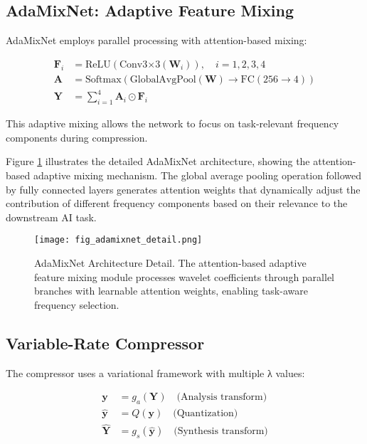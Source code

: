 \documentclass[conference]{IEEEtran}
\begin{document}
\subsection{AdaMixNet: Adaptive Feature Mixing}

AdaMixNet employs parallel processing with attention-based mixing:

\begin{align}
\mathbf{F}_i &= \text{ReLU}(\text{Conv3×3}(\mathbf{W}_i)), \quad i = 1, 2, 3, 4 \\
\mathbf{A} &= \text{Softmax}(\text{GlobalAvgPool}(\mathbf{W}) \to \text{FC}(256 \to 4)) \\
\mathbf{Y} &= \sum_{i=1}^{4} \mathbf{A}_i \odot \mathbf{F}_i
\end{align}

This adaptive mixing allows the network to focus on task-relevant frequency components during compression.

Figure \ref{fig:adamixnet_detail} illustrates the detailed AdaMixNet architecture, showing the attention-based adaptive mixing mechanism. The global average pooling operation followed by fully connected layers generates attention weights that dynamically adjust the contribution of different frequency components based on their relevance to the downstream AI task.

\begin{figure}[htbp]
\centering
\texttt{[image: fig\_adamixnet\_detail.png]}
\caption{AdaMixNet Architecture Detail. The attention-based adaptive feature mixing module processes wavelet coefficients through parallel branches with learnable attention weights, enabling task-aware frequency selection.}
\label{fig:adamixnet_detail}
\end{figure}

\subsection{Variable-Rate Compressor}

The compressor uses a variational framework with multiple λ values:

\begin{align}
\mathbf{y} &= g_a(\mathbf{Y}) \quad \text{(Analysis transform)} \\
\hat{\mathbf{y}} &= Q(\mathbf{y}) \quad \text{(Quantization)} \\
\hat{\mathbf{Y}} &= g_s(\hat{\mathbf{y}}) \quad \text{(Synthesis transform)}
\end{align}
\end{document}

